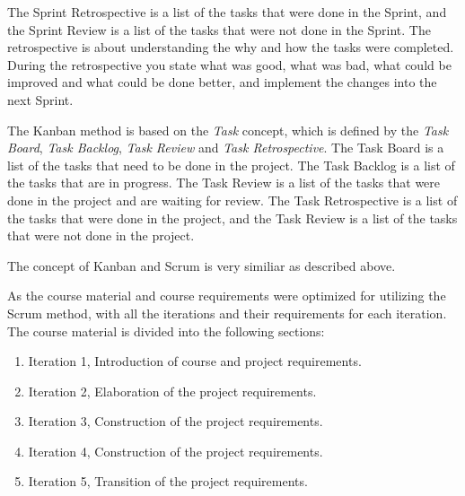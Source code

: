 The Sprint Retrospective is a list of the tasks that were done in the Sprint, and the Sprint Review is a list of the tasks that were not done in the Sprint.
The retrospective is about understanding the why and how the tasks were completed.
During the retrospective you state what was good, what was bad, what could be improved and what could be done better, and implement the changes into the next Sprint.


The Kanban\cite{atlassianKanban} method is based on the \textit{Task} concept, which is defined by the \textit{Task Board}, \textit{Task Backlog}, \textit{Task Review} and \textit{Task Retrospective}.
The Task Board is a list of the tasks that need to be done in the project.
The Task Backlog is a list of the tasks that are in progress.
The Task Review is a list of the tasks that were done in the project and are waiting for review.
The Task Retrospective is a list of the tasks that were done in the project, and the Task Review is a list of the tasks that were not done in the project.

The concept of Kanban and Scrum is very similiar as described above.


As the course material and course requirements were optimized for utilizing the Scrum\cite{atlassianScrum} method, with all the iterations and their requirements for each iteration.
The course material is divided into the following sections:
\begin{enumerate}
    \item{Iteration 1, Introduction of course and project requirements.}
    \item{Iteration 2, Elaboration of the project requirements.}
    \item{Iteration 3, Construction of the project requirements.}
    \item{Iteration 4, Construction of the project requirements.}
    \item{Iteration 5, Transition of the project requirements.}
\end{enumerate}

